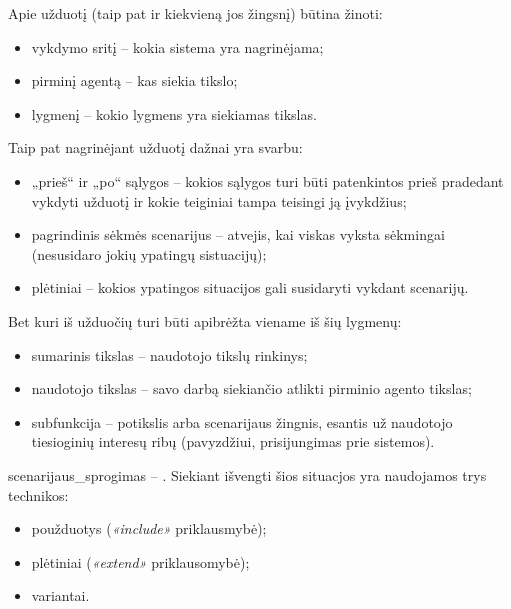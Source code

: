 Apie užduotį (taip pat ir kiekvieną jos žingsnį) būtina žinoti:
\begin{itemize}
  \item vykdymo sritį – kokia sistema yra nagrinėjama;
  \item pirminį agentą – kas siekia tikslo;
  \item lygmenį – kokio lygmens yra siekiamas tikslas.
\end{itemize}
Taip pat nagrinėjant užduotį dažnai yra svarbu:
\begin{itemize}
  \item „prieš“ ir „po“ sąlygos – kokios sąlygos turi būti patenkintos
    prieš pradedant vykdyti užduotį ir kokie teiginiai tampa teisingi
    ją įvykdžius;
  \item pagrindinis sėkmės scenarijus – atvejis, kai viskas vyksta
    sėkmingai (nesusidaro jokių ypatingų sistuacijų);
  \item plėtiniai – kokios ypatingos situacijos gali susidaryti 
    vykdant scenarijų.
\end{itemize}

Bet kuri iš užduočių turi būti apibrėžta viename iš šių lygmenų:
\begin{itemize}
  \item sumarinis tikslas – naudotojo tikslų rinkinys;
  \item naudotojo tikslas – savo darbą siekiančio atlikti pirminio agento
    tikslas;
  \item subfunkcija – potikslis arba scenarijaus žingnis, esantis už
    naudotojo tiesioginių interesų ribų (pavyzdžiui, prisijungimas
    prie sistemos).
\end{itemize}


\Gls{scenarijaus_sprogimas} – .
Siekiant išvengti šios situacjos yra naudojamos trys technikos:
\begin{itemize}
  \item použduotys (\emph{«include»} priklausmybė);
  \item plėtiniai (\emph{«extend»} priklausomybė);
  \item variantai.
\end{itemize}
